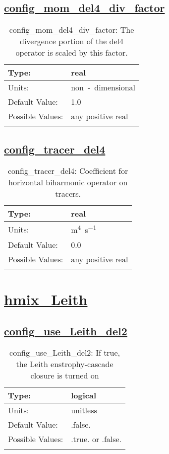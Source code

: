 \subsection[config\_mom\_del4\_div\_factor]{\hyperref[sec:nm_tab_hmix_del4]{config\_mom\_del4\_div\_factor}}
\label{subsec:nm_sec_config_mom_del4_div_factor}
\begin{center}
\begin{longtable}{| p{2.0in} || p{4.0in} |}
    \hline
    Type: & real \\
    \hline
    Units: & \si{non-dimensional} \\
    \hline
    Default Value: & 1.0 \\
    \hline
    Possible Values: & any positive real \\
    \hline
    \caption{config\_mom\_del4\_div\_factor: The divergence portion of the del4 operator is scaled by this factor.}
\end{longtable}
\end{center}
\subsection[config\_tracer\_del4]{\hyperref[sec:nm_tab_hmix_del4]{config\_tracer\_del4}}
\label{subsec:nm_sec_config_tracer_del4}
\begin{center}
\begin{longtable}{| p{2.0in} || p{4.0in} |}
    \hline
    Type: & real \\
    \hline
    Units: & \si{m^4.s^{-1}} \\
    \hline
    Default Value: & 0.0 \\
    \hline
    Possible Values: & any positive real \\
    \hline
    \caption{config\_tracer\_del4: Coefficient for horizontal biharmonic operator on tracers.}
\end{longtable}
\end{center}
\section[hmix\_Leith]{\hyperref[sec:nm_tab_hmix_Leith]{hmix\_Leith}}
\label{sec:nm_sec_hmix_Leith}
\subsection[config\_use\_Leith\_del2]{\hyperref[sec:nm_tab_hmix_Leith]{config\_use\_Leith\_del2}}
\label{subsec:nm_sec_config_use_Leith_del2}
\begin{center}
\begin{longtable}{| p{2.0in} || p{4.0in} |}
    \hline
    Type: & logical \\
    \hline
    Units: & \si{unitless} \\
    \hline
    Default Value: & .false. \\
    \hline
    Possible Values: & .true. or .false. \\
    \hline
    \caption{config\_use\_Leith\_del2: If true, the Leith enstrophy-cascade closure is turned on}
\end{longtable}
\end{center}

